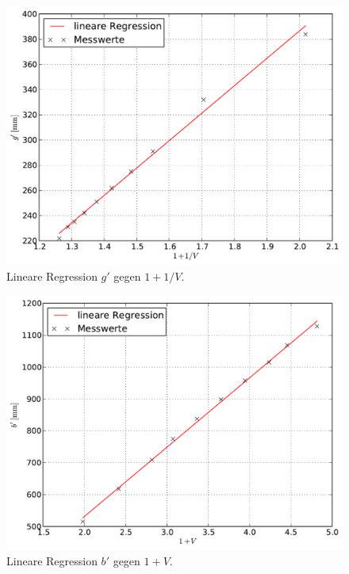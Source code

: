 		\begin{figure}[h!]
			\centering
			\includegraphics[width = 15cm]{img/graph_abbe_g.pdf}
			\caption{Lineare Regression $g'$ gegen $1 + 1/V$.}
			\label{fig:lin_reg_g}
		\end{figure}

		\begin{figure}[h!]
			\centering
			\includegraphics[width = 15cm]{img/graph_abbe_b.pdf}
			\caption{Lineare Regression $b'$ gegen $1 + V$.}
			\label{fig:lin_reg_g}
		\end{figure}